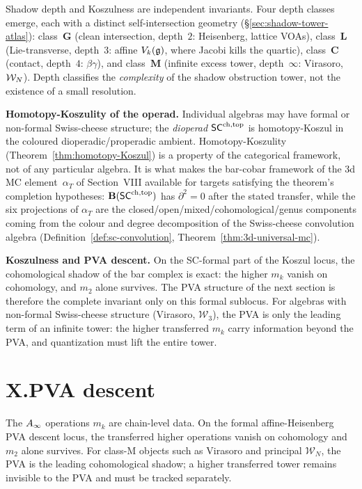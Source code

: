 Shadow depth and Koszulness are independent invariants.
Four depth classes emerge, each with a distinct
self-intersection geometry
(\S\ref{sec:shadow-tower-atlas}): class~$\mathbf{G}$ (clean
intersection, depth~$2$: Heisenberg, lattice VOAs),
class~$\mathbf{L}$ (Lie-transverse, depth~$3$: affine
$V_k(\mathfrak{g})$, where Jacobi kills the quartic),
class~$\mathbf{C}$ (contact, depth~$4$: $\beta\gamma$), and
class~$\mathbf{M}$ (infinite excess tower, depth~$\infty$:
Virasoro, $\mathcal{W}_N$). Depth classifies the \emph{complexity}
of the shadow obstruction tower, not the existence of a small resolution.

\medskip\noindent\textbf{Homotopy-Koszulity of the operad.}\enspace
Individual algebras may have formal or non-formal
Swiss-cheese structure; the \emph{dioperad} $\mathsf{SC}^{\mathrm{ch,top}}$
is homotopy-Koszul in the coloured dioperadic/properadic ambient.
Homotopy-Koszulity (Theorem~\ref{thm:homotopy-Koszul}) is a property
of the categorical framework, not of any particular algebra. It is
what makes the bar-cobar framework of the 3d MC element~$\alpha_T$ of
Section~VIII available for targets satisfying the theorem's
completion hypotheses: $\mathbf{B}(\mathsf{SC}^{\mathrm{ch,top}})$ has $\partial^2 = 0$
after the stated transfer, while the six projections of
$\alpha_T$ are the closed/open/mixed/cohomological/genus components
coming from the colour and degree decomposition of the Swiss-cheese
convolution algebra
\textup{(}Definition~\textup{\ref{def:sc-convolution}},
Theorem~\textup{\ref{thm:3d-universal-mc}}\textup{)}.

\medskip\noindent\textbf{Koszulness and PVA descent.}\enspace
On the SC-formal part of the Koszul locus, the cohomological shadow
of the bar complex is exact: the higher $m_k$ vanish on cohomology,
and $m_2$ alone survives. The PVA structure of the next section is
therefore the complete invariant only on this formal sublocus. For
algebras with non-formal Swiss-cheese structure
(Virasoro, $\mathcal{W}_3$), the PVA is only the leading term of an
infinite tower: the higher transferred $m_k$ carry information beyond
the PVA, and quantization must lift the entire tower.


\section*{X.\quad PVA descent}
\label{sec:preface-pva-descent}

The $A_\infty$ operations $m_k$ are chain-level data. On the formal
affine-Heisenberg PVA descent locus, the transferred higher
operations vanish on cohomology and $m_2$ alone survives.  For class-M
objects such as Virasoro and principal $\mathcal W_N$, the PVA is the
leading cohomological shadow; a higher transferred tower remains
invisible to the PVA and must be tracked separately.


